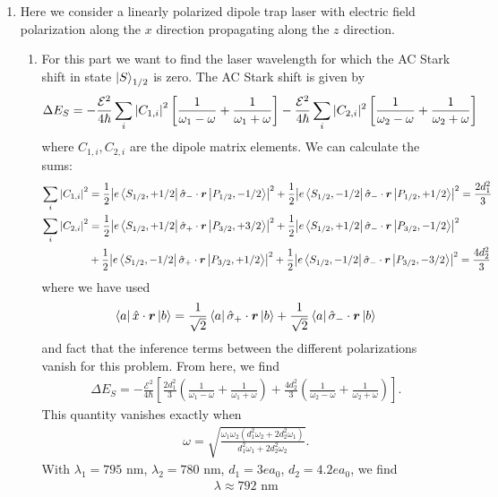 \documentclass{article}
\theoremstyle{definition}
\newcommand{\f}[2]{\frac{#1}{#2}}
\newcommand{\lp}{\left(}
\newcommand{\rp}{\right)}
\newcommand{\lb}{\left[}
\newcommand{\rb}{\right]}
\begin{document}
\begin{enumerate}[label=(\alph*)]
	\item Here we consider a linearly polarized dipole trap laser with electric field polarization along the $x$ direction propagating along the $z$ direction. 
	
	\begin{enumerate}[label=(\roman*)]
		\item For this part we want to find the laser wavelength for which the AC Stark shift in state $\ket{S}_{1/2}$ is zero. The AC Stark shift is given by 
		\begin{align*}
			\Delta E_S = -\f{\mathcal{E}^2}{4\hbar} \sum_i \abs{C_{1,i}}^2 \lb \f{1}{\omega_1 - \omega} + \f{1}{\omega_1+\omega} \rb  -\f{\mathcal{E}^2}{4\hbar} \sum_i |C_{2,i}|^2 \lb \f{1}{\omega_2 - \omega} + \f{1}{\omega_2+\omega} \rb
		\end{align*}
	where $C_{1,i}, C_{2,i}$ are the dipole matrix elements. We can calculate the sums:
	\begin{align*}
		 \sum_i \abs{C_{1,i}}^2 &= \f{1}{2}\abs{e\bra{S_{1/2},+1/2} \hat{\sigma}_-\cdot \bm{r} \ket{P_{1/2},-1/2}}^2 + \f{1}{2} \abs{e\bra{S_{1/2},-1/2} \hat{\sigma}_-\cdot \bm{r}   \ket{P_{1/2},+1/2}}^2 = \f{2d_1^2}{3}\\
		 \sum_i \abs{C_{2,i}}^2 &= \f{1}{2}\abs{e\bra{S_{1/2},+1/2} \hat{\sigma}_+\cdot \bm{r} \ket{P_{3/2},+3/2}}^2 + \f{1}{2} \abs{e\bra{S_{1/2},+1/2} \hat{\sigma}_-\cdot \bm{r}   \ket{P_{3/2},-1/2}}^2\\
		 & + \f{1}{2}\abs{e\bra{S_{1/2},-1/2} \hat{\sigma}_+\cdot \bm{r} \ket{P_{3/2},+1/2}}^2 + \f{1}{2} \abs{e\bra{S_{1/2},-1/2} \hat{\sigma}_-\cdot \bm{r}   \ket{P_{3/2},-3/2}}^2 = \f{4d_2^2}{3}
	\end{align*}
	where we have used
	\begin{align*}
		\bra{a} \hat{x} \cdot \bm{r} \ket{b} = \f{1}{\sqrt{2}}  \bra{a} \hat{\sigma}_+ \cdot \bm{r} \ket{b} + \f{1}{\sqrt{2}} \bra{a} \hat{\sigma}_- \cdot \bm{r} \ket{b}
	\end{align*}
	and fact that the inference terms between the different polarizations vanish for this problem. From here, we find 
	\begin{align*}
	\Delta E_S = -\f{\mathcal{E}^2}{4\hbar}\lb \f{2d_1^2}{3}\lp \f{1}{\omega_1-\omega} + \f{1}{\omega_1+\omega} \rp + \f{4d_2^2}{3}\lp \f{1}{\omega_2-\omega} + \f{1}{\omega_2+\omega} \rp \rb.
	\end{align*}
	This quantity vanishes exactly when 
	\begin{align*}
	\omega = \sqrt{\f{\omega_1\omega_2( d_1^2\omega_2 + 2d_2^2\omega_1)}{d_1^2 \omega_1 + 2d_2^2\omega_2 }}.
	\end{align*}
	With $\lambda_1 = 795$ nm, $\lambda_2 = 780$ nm, $d_1 = 3 ea_0$, $d_2 = 4.2 ea_0$, we find 
	\begin{align*}
	\boxed{\lambda \approx 792 \text{ nm}}
	\end{align*}
	

\end{enumerate}
\end{enumerate}
\end{document}
